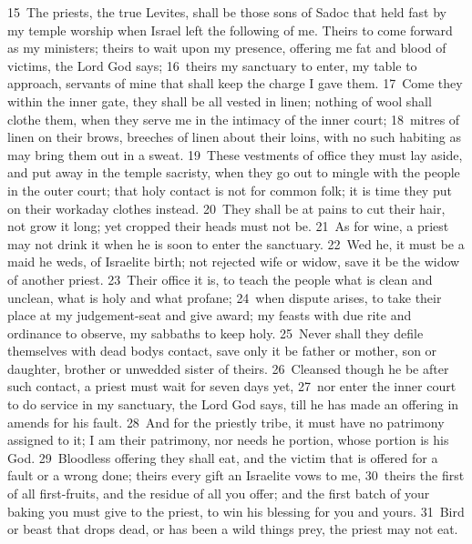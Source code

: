 \documentclass[10pt]{book} %
\begin{document}
\textcolor{benred8}{15}~The priests, the true Levites, shall be those sons of Sadoc that held fast by my temple worship when Israel left the following of me. Theirs to come forward as my ministers; theirs to wait upon my presence, offering me fat and blood of victims, the Lord God says; \textcolor{benred8}{16}~theirs my sanctuary to enter, my table to approach, servants of mine that shall keep the charge I gave them. \textcolor{benred8}{17}~Come they within the inner gate, they shall be all vested in linen; nothing of wool shall clothe them, when they serve me in the intimacy of the inner court; \textcolor{benred8}{18}~mitres of linen on their brows, breeches of linen about their loins, with no such habiting as may bring them out in a sweat. \textcolor{benred8}{19}~These vestments of office they must lay aside, and put away in the temple sacristy, when they go out to mingle with the people in the outer court; that holy contact is not for common folk; it is time they put on their workaday clothes instead.
\textcolor{benred8}{20}~They shall be at pains to cut their hair, not grow it long; yet cropped their heads must not be. \textcolor{benred8}{21}~As for wine, a priest may not drink it when he is soon to enter the sanctuary. \textcolor{benred8}{22}~Wed he, it must be a maid he weds, of Israelite birth; not rejected wife or widow, save it be the widow of another priest. \textcolor{benred8}{23}~Their office it is, to teach the people what is clean and unclean, what is holy and what profane; \textcolor{benred8}{24}~when dispute arises, to take their place at my judgement-seat and give award; my feasts with due rite and ordinance to observe, my sabbaths to keep holy. \textcolor{benred8}{25}~Never shall they defile themselves with dead body\textquotesingle s contact, save only it be father or mother, son or daughter, brother or unwedded sister of theirs. \textcolor{benred8}{26}~Cleansed though he be after such contact, a priest must wait for seven days yet, \textcolor{benred8}{27}~nor enter the inner court to do service in my sanctuary, the Lord God says, till he has made an offering in amends for his fault. \textcolor{benred8}{28}~And for the priestly tribe, it must have no patrimony assigned to it; I am their patrimony, nor needs he portion, whose portion is his God. \textcolor{benred8}{29}~Bloodless offering they shall eat, and the victim that is offered for a fault or a wrong done; theirs every gift an Israelite vows to me, \textcolor{benred8}{30}~theirs the first of all first-fruits, and the residue of all you offer; and the first batch of your baking you must give to the priest, to win his blessing for you and yours. \textcolor{benred8}{31}~Bird or beast that drops dead, or has been a wild thing\textquotesingle s prey, the priest may not eat.
\end{document}
